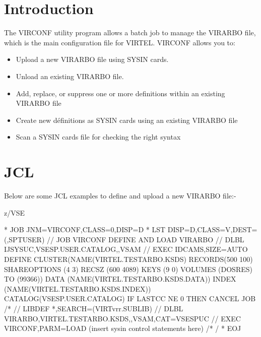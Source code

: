 \documentclass[letterpaper,10pt,english]{sphinxmanual}
\begin{document}
\section{Introduction}
\label{\detokenize{Installation_Guide:id9}}
The VIRCONF utility program allows a batch job to manage the VIRARBO file, which is the main configuration file for VIRTEL. VIRCONF allows you to:
\begin{itemize}
\item {} 
Upload a new VIRARBO file using SYSIN cards.

\item {} 
Unload an existing VIRARBO file.

\item {} 
Add, replace, or suppress one or more definitions within an existing VIRARBO file

\item {} 
Create new définitions as SYSIN cards using an existing VIRARBO file

\item {} 
Scan a SYSIN cards file for checking the right syntax

\end{itemize}


\section{JCL}
\label{\detokenize{Installation_Guide:jcl}}\label{\detokenize{Installation_Guide:index-151}}
Below are some JCL examples to define and upload a new VIRARBO file:-

z/VSE

\begin{sphinxVerbatim}[commandchars=\\\{\}]
* \PYGZdl{}\PYGZdl{} JOB JNM=VIRCONF,CLASS=0,DISP=D
* \PYGZdl{}\PYGZdl{} LST DISP=D,CLASS=V,DEST=(,SPTUSER)
// JOB VIRCONF DEFINE AND LOAD VIRARBO
// DLBL IJSYSUC,\PYGZsq{}VSESP.USER.CATALOG\PYGZsq{},,VSAM
// EXEC IDCAMS,SIZE=AUTO
        DEFINE CLUSTER(NAME(VIRTEL.TESTARBO.KSDS) \PYGZhy{}
              RECORDS(500 100) SHAREOPTIONS (4 3) \PYGZhy{}
              RECSZ (600 4089) KEYS (9 0) \PYGZhy{}
              VOLUMES (DOSRES) TO (99366))\PYGZhy{}
        DATA (NAME(VIRTEL.TESTARBO.KSDS.DATA)) \PYGZhy{}
        INDEX (NAME(VIRTEL.TESTARBO.KSDS.INDEX)) \PYGZhy{}
              CATALOG(VSESP.USER.CATALOG)
IF LASTCC NE 0 THEN CANCEL JOB
/*
// LIBDEF *,SEARCH=(VIRTvrr.SUBLIB)
// DLBL VIRARBO,\PYGZsq{}VIRTEL.TESTARBO.KSDS\PYGZsq{},,VSAM,CAT=VSESPUC
// EXEC VIRCONF,PARM=\PYGZsq{}LOAD\PYGZsq{}
        (insert sysin control statements here)
/*
/\PYGZam{}
* \PYGZdl{}\PYGZdl{} EOJ
\end{sphinxVerbatim}
\end{document}
